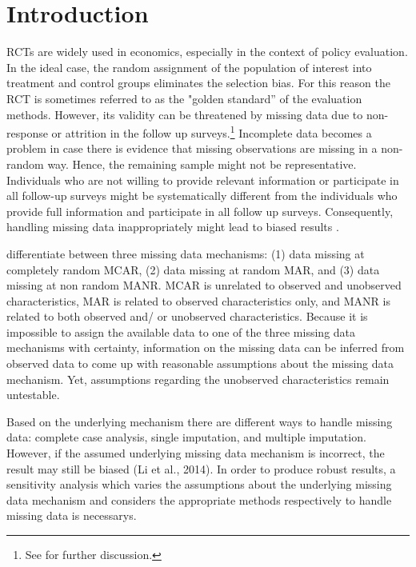 
\section{Introduction}


\acp{RCT} are widely used in economics, especially in the context of policy evaluation. In the ideal case, the random assignment of the population of interest into treatment and control groups eliminates the selection bias. For this reason the \ac{RCT} is sometimes referred to as the "golden standard'' of the evaluation methods.
However, its validity can be threatened by missing data due to non-response or attrition in the follow up surveys.\footnote{See \cite{angristmostly2008} for further discussion.} Incomplete data becomes a problem in case there is evidence that missing observations are missing in a non-random way. Hence, the remaining sample might not be representative. Individuals who are not willing to provide relevant information or participate in all follow-up surveys might be systematically different from the individuals who provide full information and participate in all follow up surveys. Consequently, handling missing data inappropriately might lead to biased results \cite{heckman1976common, lee2009training, kling2007experimental}.

\cite{little1989analysis} differentiate between three missing data mechanisms: (1) data missing at completely random \ac{MCAR}, (2) data missing at random \ac{MAR}, and (3) data missing at non random \ac{MANR}. \ac{MCAR} is unrelated to observed and unobserved characteristics, \ac{MAR} is related to observed characteristics only, and \ac{MANR} is related to both observed and/ or unobserved characteristics. Because it is impossible to assign the available data to one of the three missing data mechanisms with certainty, information on the missing data can be inferred from observed data to come up with reasonable assumptions about the missing data mechanism. Yet, assumptions regarding the unobserved characteristics remain untestable.

Based on the underlying mechanism there are different ways to handle missing data: complete case analysis, single imputation, and multiple imputation. However, if the assumed underlying missing data mechanism is incorrect, the result may still be biased (Li et al., 2014).
In order to produce robust results, a sensitivity analysis which varies the assumptions about the underlying missing data mechanism and considers the appropriate methods respectively to handle missing data is necessarys.

